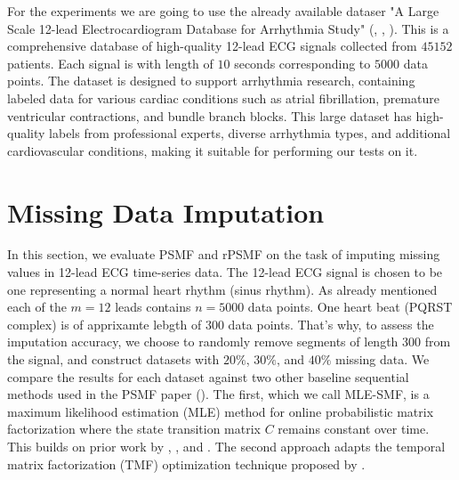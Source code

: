 \documentclass{mldsmsc}
\begin{document}
For the experiments we are going to use the already available dataser "A Large Scale 12-lead Electrocardiogram Database for Arrhythmia Study" (\cite{cite1}, \cite{cite2}, \cite{cite3}). This is a comprehensive database of high-quality 12-lead ECG signals collected from $45 152$ patients. Each signal is with length of $10$ seconds corresponding to $5 000$ data points. The dataset is designed to support arrhythmia research, containing labeled data for various cardiac conditions such as atrial fibrillation, premature ventricular contractions, and bundle branch blocks. This large dataset has high-quality labels from professional experts, diverse arrhythmia types, and additional cardiovascular conditions, making it suitable for performing our tests on it. \newline






\section{Missing Data Imputation}

In this section, we evaluate PSMF and rPSMF on the task of imputing missing values in 12-lead ECG time-series data. The 12-lead ECG signal is chosen to be one representing a normal heart rhythm (sinus rhythm). As already mentioned each of the $m = 12$ leads contains $n = 5000$ data points. One heart beat (PQRST complex) is of apprixamte lebgth of $300$ data points. That's why, to assess the imputation accuracy, we choose to randomly remove segments of length $300$ from the signal, and construct datasets with $20\%$, $30\%$, and $40\%$ missing data. We compare the results for each dataset against two other baseline sequential methods used in the PSMF paper (\cite{akyildiz2021probabilistic}). The first, which we call MLE-SMF, is a maximum likelihood estimation (MLE) method for online probabilistic matrix factorization where the state transition matrix $C$ remains constant over time. This builds on prior work by \cite{YILDIRIM2012494}, \cite{6288274}, and \cite{6638240}. The second approach adapts the temporal matrix factorization (TMF) optimization technique proposed by \cite{NIPS2016_85422afb}. \newline
\end{document}
